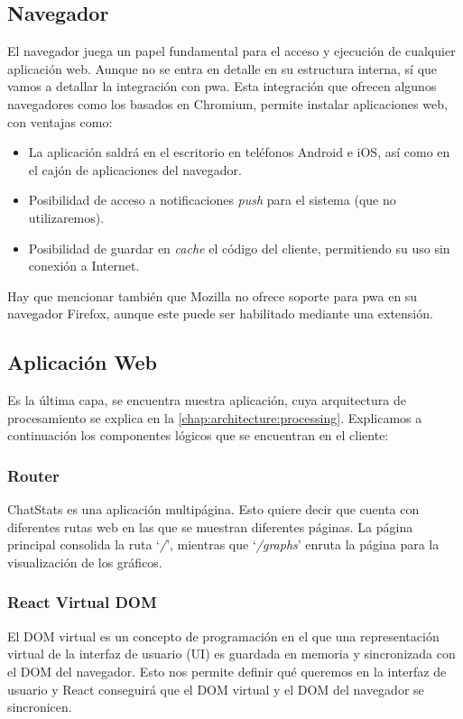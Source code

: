 
\subsection{Navegador}

El navegador juega un papel fundamental para el acceso y ejecución de cualquier aplicación web. Aunque no se entra en detalle en su estructura interna, sí que vamos a detallar la integración con \acrfull{pwa}. Esta integración que ofrecen algunos navegadores como los basados en Chromium, permite instalar aplicaciones web, con ventajas como:

\begin{itemize}
	\item La aplicación saldrá en el escritorio en teléfonos Android e iOS, así como en el cajón de aplicaciones del navegador.
	\item Posibilidad de acceso a notificaciones \textit{push} para el sistema (que no utilizaremos).
	\item Posibilidad de guardar en \textit{cache} el código del cliente, permitiendo su uso sin conexión a Internet.
\end{itemize}

Hay que mencionar también que Mozilla no ofrece soporte para \acrshort{pwa} en su navegador Firefox\cite{firefoxNoPWA}, aunque este puede ser habilitado mediante una extensión\cite{firefoxPWAextension}.

\subsection{Aplicación Web}

Es la última capa, se encuentra nuestra aplicación, cuya arquitectura de procesamiento se explica en la \autoref{chap:architecture:processing}. Explicamos a continuación los componentes lógicos que se encuentran en el cliente:

\subsubsection{Router}

ChatStats es una aplicación multipágina. Esto quiere decir que cuenta con diferentes rutas web en las que se muestran diferentes páginas. La página principal consolida la ruta `\textit{/}', mientras que `\textit{/graphs}' enruta la página para la visualización de los gráficos.

\subsubsection{React Virtual DOM}

El DOM virtual es un concepto de programación en el que una representación virtual de la interfaz de usuario (UI) es guardada en memoria y sincronizada con el DOM del navegador. Esto nos permite definir qué queremos en la interfaz de usuario y React conseguirá que el DOM virtual y el DOM del navegador se sincronicen.


\newpage

